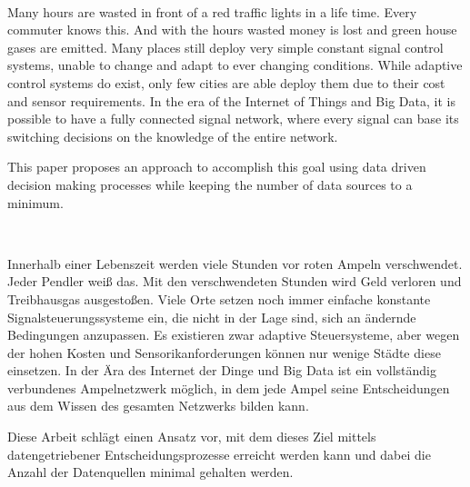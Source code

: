 \vspace{3cm}
\begingroup
{}\\
\endgroup
\vspace{1.5cm}

Many hours are wasted in front of a red traffic lights in a life time. Every commuter knows this. And with the hours wasted money is lost and green house gases are emitted. Many places still deploy very simple constant signal control systems, unable to change and adapt to ever changing conditions. While adaptive control systems do exist, only few cities are able deploy them due to their cost and sensor requirements. In the era of the Internet of Things and Big Data, it is possible to have a fully connected signal network, where every signal can base its switching decisions on the knowledge of the entire network.

This paper proposes an approach to accomplish this goal using data driven decision making processes while keeping the number of data sources to a minimum.


\vspace{1.5cm}
\begingroup
{}\\
\endgroup
\vspace{1.5cm}

Innerhalb einer Lebenszeit werden viele Stunden vor roten Ampeln verschwendet. Jeder Pendler weiß das. Mit den verschwendeten Stunden wird Geld verloren und Treibhausgas ausgestoßen. Viele Orte setzen noch immer einfache konstante Signalsteuerungssysteme ein, die nicht in der Lage sind, sich an ändernde Bedingungen anzupassen. Es existieren zwar adaptive Steuersysteme, aber wegen der hohen Kosten und Sensorikanforderungen können nur wenige Städte diese einsetzen. In der Ära des Internet der Dinge und Big Data ist ein vollständig verbundenes Ampelnetzwerk möglich, in dem jede Ampel seine Entscheidungen aus dem Wissen des gesamten Netzwerks bilden kann.

Diese Arbeit schlägt einen Ansatz vor, mit dem dieses Ziel mittels datengetriebener Entscheidungsprozesse erreicht werden kann und dabei die Anzahl der Datenquellen minimal gehalten werden.
